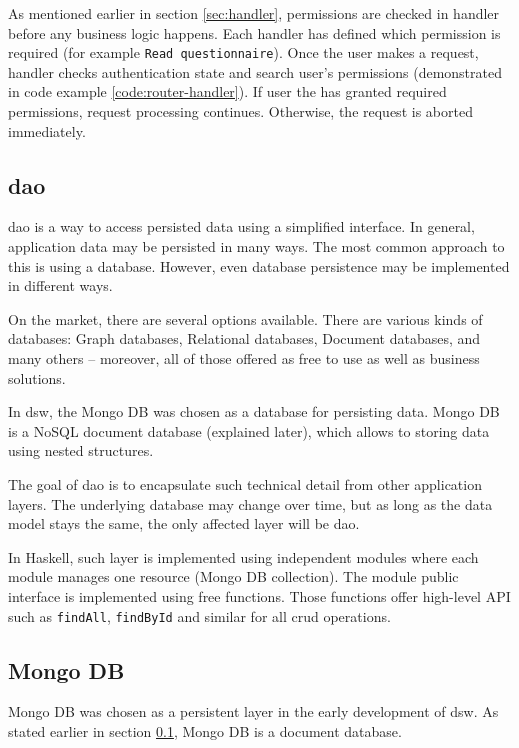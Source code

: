 As mentioned earlier in section \ref{sec:handler}, permissions are checked in handler before any business logic happens.
Each handler has defined which permission is required (for example \texttt{Read questionnaire}).
Once the user makes a request, handler checks authentication state and search user's permissions (demonstrated in code example \ref{code:router-handler}).
If user the has granted required permissions, request processing continues.
Otherwise, the request is aborted immediately.

\subsection{\gls{dao}}\label{sec:dao}
\gls{dao} is a way to access persisted data using a simplified interface.
In general, application data may be persisted in many ways.
The most common approach to this is using a database\cite{dzone-fs-vs-db}.
However, even database persistence may be implemented in different ways.

On the market, there are several options available.
There are various kinds of databases: Graph databases, Relational databases, Document databases, and many others -- moreover, all of those offered as free to use as well as business solutions.

In \gls{dsw}, the Mongo DB was chosen as a database for persisting data.
Mongo DB is a NoSQL document database (explained later), which allows to storing data using nested structures.

The goal of \gls{dao} is to encapsulate such technical detail from other application layers.
The underlying database may change over time, but as long as the data model stays the same, the only affected layer will be \gls{dao}.

In Haskell, such layer is implemented using independent modules where each module manages one resource (Mongo DB collection).
The module public interface is implemented using free functions.
Those functions offer high-level API such as \texttt{findAll}, \texttt{findById} and similar for all \gls{crud} operations.


\subsection{Mongo DB}\label{sec:mongo-db}
Mongo DB was chosen as a persistent layer in the early development of \gls{dsw}.
As stated earlier in section \ref{sec:dao}, Mongo DB is a document database.

